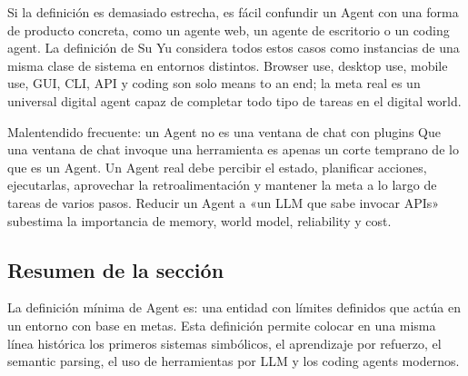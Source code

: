 Si la definición es demasiado estrecha, es fácil confundir un Agent con una forma de producto concreta, como un agente web, un agente de escritorio o un coding agent. La definición de Su Yu considera todos estos casos como instancias de una misma clase de sistema en entornos distintos. Browser use, desktop use, mobile use, GUI, CLI, API y coding son solo means to an end; la meta real es un universal digital agent capaz de completar todo tipo de tareas en el digital world.

\begin{warningbox}{Malentendido frecuente: un Agent no es una ventana de chat con plugins}
Que una ventana de chat invoque una herramienta es apenas un corte temprano de lo que es un Agent. Un Agent real debe percibir el estado, planificar acciones, ejecutarlas, aprovechar la retroalimentación y mantener la meta a lo largo de tareas de varios pasos. Reducir un Agent a «un LLM que sabe invocar APIs» subestima la importancia de memory, world model, reliability y cost.
\end{warningbox}

\subsection{Resumen de la sección}

La definición mínima de Agent es: una entidad con límites definidos que actúa en un entorno con base en metas. Esta definición permite colocar en una misma línea histórica los primeros sistemas simbólicos, el aprendizaje por refuerzo, el semantic parsing, el uso de herramientas por LLM y los coding agents modernos.
